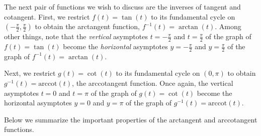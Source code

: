 \documentclass{ximera}
\begin{document}
The next pair of functions we wish to discuss are the inverses of tangent and cotangent.  First, we restrict $f(t) = \tan(t)$ to its fundamental cycle on $\left(-\frac{\pi}{2}, \frac{\pi}{2}\right)$ to obtain the arctangent function, $f^{-1}(t) = \arctan(t)$. Among other things, note that the \textit{vertical} asymptotes $t = -\frac{\pi}{2}$ and $t = \frac{\pi}{2}$ of the graph of $f(t) = \tan(t)$ become the \textit{horizontal} asymptotes $y = -\frac{\pi}{2}$ and $y = \frac{\pi}{2}$ of the graph of $f^{-1}(t) = \arctan(t)$.  

\begin{center}
\end{center}

Next, we restrict $g(t) = \cot(t)$ to its fundamental cycle on $(0,\pi)$ to obtain $g^{-1}(t) = \text{arccot}(t)$, the arccotangent function.  Once again, the vertical asymptotes $t=0$ and $t=\pi$ of the graph of $g(t) = \cot(t)$ become the horizontal asymptotes $y = 0$ and $y = \pi$ of the graph of $g^{-1}(t) = \text{arccot}(t)$.  

\begin{center}
\end{center}


Below we summarize the important properties of the arctangent and arccotangent functions.


\end{document}
